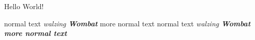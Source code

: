 \documentclass[a4paper,12pt]{article}
\begin{document}
  Hello World!







  normal text {\itshape walzing \bfseries Wombat} more normal text
  normal text \bgroup\itshape walzing \bfseries Wombat\egroup{} more normal text
\end{document}
